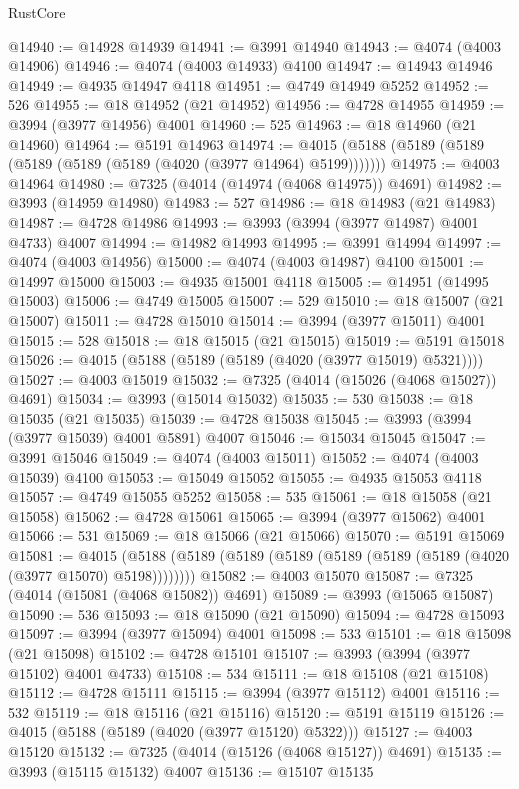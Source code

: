 \begin{lexlean}{RustCore}
\begin{coremodule}
@14940 := @14928 @14939
@14941 := @3991 @14940
@14943 := @4074 (@4003 @14906)
@14946 := @4074 (@4003 @14933) @4100
@14947 := @14943 @14946
@14949 := @4935 @14947 @4118
@14951 := @4749 @14949 @5252
@14952 := 526
@14955 := @18 @14952 (@21 @14952)
@14956 := @4728 @14955
@14959 := @3994 (@3977 @14956) @4001
@14960 := 525
@14963 := @18 @14960 (@21 @14960)
@14964 := @5191 @14963
@14974 := @4015 (@5188 (@5189 (@5189 (@5189 (@5189 (@5189 (@4020 (@3977 @14964) @5199)))))))
@14975 := @4003 @14964
@14980 := @7325 (@4014 (@14974 (@4068 @14975)) @4691)
@14982 := @3993 (@14959 @14980)
@14983 := 527
@14986 := @18 @14983 (@21 @14983)
@14987 := @4728 @14986
@14993 := @3993 (@3994 (@3977 @14987) @4001 @4733) @4007
@14994 := @14982 @14993
@14995 := @3991 @14994
@14997 := @4074 (@4003 @14956)
@15000 := @4074 (@4003 @14987) @4100
@15001 := @14997 @15000
@15003 := @4935 @15001 @4118
@15005 := @14951 (@14995 @15003)
@15006 := @4749 @15005
@15007 := 529
@15010 := @18 @15007 (@21 @15007)
@15011 := @4728 @15010
@15014 := @3994 (@3977 @15011) @4001
@15015 := 528
@15018 := @18 @15015 (@21 @15015)
@15019 := @5191 @15018
@15026 := @4015 (@5188 (@5189 (@5189 (@4020 (@3977 @15019) @5321))))
@15027 := @4003 @15019
@15032 := @7325 (@4014 (@15026 (@4068 @15027)) @4691)
@15034 := @3993 (@15014 @15032)
@15035 := 530
@15038 := @18 @15035 (@21 @15035)
@15039 := @4728 @15038
@15045 := @3993 (@3994 (@3977 @15039) @4001 @5891) @4007
@15046 := @15034 @15045
@15047 := @3991 @15046
@15049 := @4074 (@4003 @15011)
@15052 := @4074 (@4003 @15039) @4100
@15053 := @15049 @15052
@15055 := @4935 @15053 @4118
@15057 := @4749 @15055 @5252
@15058 := 535
@15061 := @18 @15058 (@21 @15058)
@15062 := @4728 @15061
@15065 := @3994 (@3977 @15062) @4001
@15066 := 531
@15069 := @18 @15066 (@21 @15066)
@15070 := @5191 @15069
@15081 := @4015 (@5188 (@5189 (@5189 (@5189 (@5189 (@5189 (@5189 (@4020 (@3977 @15070) @5198))))))))
@15082 := @4003 @15070
@15087 := @7325 (@4014 (@15081 (@4068 @15082)) @4691)
@15089 := @3993 (@15065 @15087)
@15090 := 536
@15093 := @18 @15090 (@21 @15090)
@15094 := @4728 @15093
@15097 := @3994 (@3977 @15094) @4001
@15098 := 533
@15101 := @18 @15098 (@21 @15098)
@15102 := @4728 @15101
@15107 := @3993 (@3994 (@3977 @15102) @4001 @4733)
@15108 := 534
@15111 := @18 @15108 (@21 @15108)
@15112 := @4728 @15111
@15115 := @3994 (@3977 @15112) @4001
@15116 := 532
@15119 := @18 @15116 (@21 @15116)
@15120 := @5191 @15119
@15126 := @4015 (@5188 (@5189 (@4020 (@3977 @15120) @5322)))
@15127 := @4003 @15120
@15132 := @7325 (@4014 (@15126 (@4068 @15127)) @4691)
@15135 := @3993 (@15115 @15132) @4007
@15136 := @15107 @15135

\end{coremodule}
\end{lexlean}
